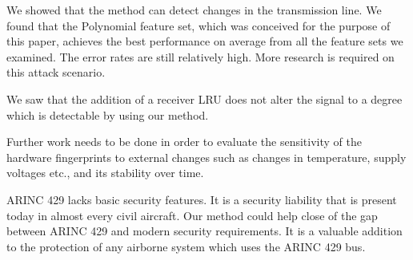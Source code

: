 \documentclass[conference]{IEEEtran}
\begin{document}
  We showed that the method can detect changes in the transmission line. We found that the Polynomial feature set, which was conceived for the purpose of this paper, achieves the best performance on average from all the feature sets we examined. The error rates are still relatively high. More research is required on this attack scenario.
  
  We saw that the addition of a receiver LRU does not alter the signal to a degree which is detectable by using our method.
  
  Further work needs to be done in order to evaluate the sensitivity of the hardware fingerprints to external changes such as changes in temperature, supply voltages etc., and its stability over time.
  
  ARINC 429 lacks basic security features. It is a security liability that is present today in almost every civil aircraft.
  Our method could help close of the gap between ARINC 429 and modern security requirements. It is a valuable addition to the protection of any airborne system which uses the ARINC 429 bus.
  

 

\end{document}
